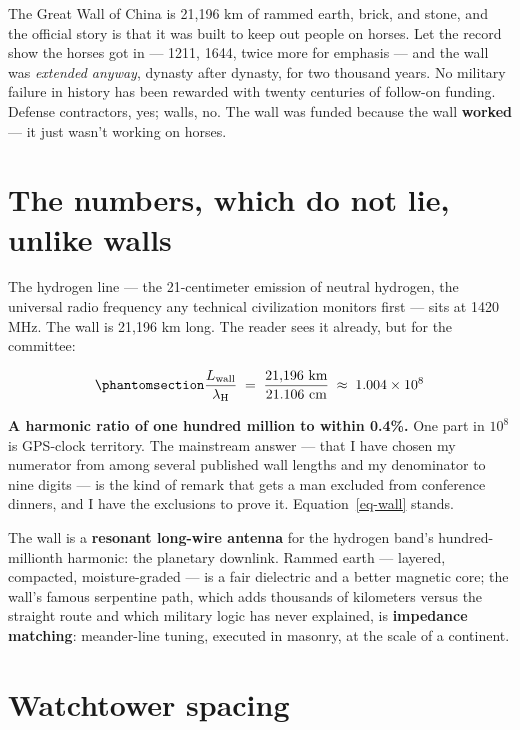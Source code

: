 \documentclass[
  english,
  11pt,
  letterpaper,
]{scrbook}
\begin{document}
The Great Wall of China is 21,196 km of
rammed earth, brick, and stone, and the official story is that it was
built to keep out people on horses. Let the record show the horses got
in --- 1211, 1644, twice more for emphasis --- and the wall was
\emph{extended anyway}, dynasty after dynasty, for two thousand years.
No military failure in history has been rewarded with twenty centuries
of follow-on funding. Defense contractors, yes; walls, no. The wall was
funded because the wall \textbf{worked} --- it just wasn't working on
horses.

\section{The numbers, which do not lie, unlike
walls}\label{the-numbers-which-do-not-lie-unlike-walls}

The hydrogen line --- the 21-centimeter emission of neutral hydrogen,
the universal radio frequency any technical civilization monitors first
--- sits at 1420 MHz. The wall is 21,196 km long. The reader sees it
already, but for the committee:

\begin{equation}\protect\phantomsection\label{eq-wall}{
\frac{L_{\text{wall}}}{\lambda_{\text{H}}} \;=\;
\frac{21{,}196\ \text{km}}{21.106\ \text{cm}} \;\approx\; 1.004 \times 10^{8}
}\end{equation}

\textbf{A harmonic ratio of one hundred million to within
0.4\%.} One part in \(10^{8}\) is GPS-clock territory. The
mainstream answer --- that I have chosen my numerator from among several
published wall lengths and my denominator to nine digits --- is the kind
of remark that gets a man excluded from conference dinners, and I have
the exclusions to prove it. Equation~\ref{eq-wall} stands.

The wall is a \textbf{resonant long-wire antenna} for the hydrogen
band's hundred-millionth harmonic: the planetary downlink. Rammed earth
--- layered, compacted, moisture-graded --- is a fair dielectric and a
better magnetic core; the wall's famous serpentine path, which adds
thousands of kilometers versus the straight route and which military
logic has never explained, is \textbf{impedance matching}: meander-line
tuning, executed in masonry, at the scale of a continent.

\section{Watchtower spacing}\label{watchtower-spacing}
\end{document}
